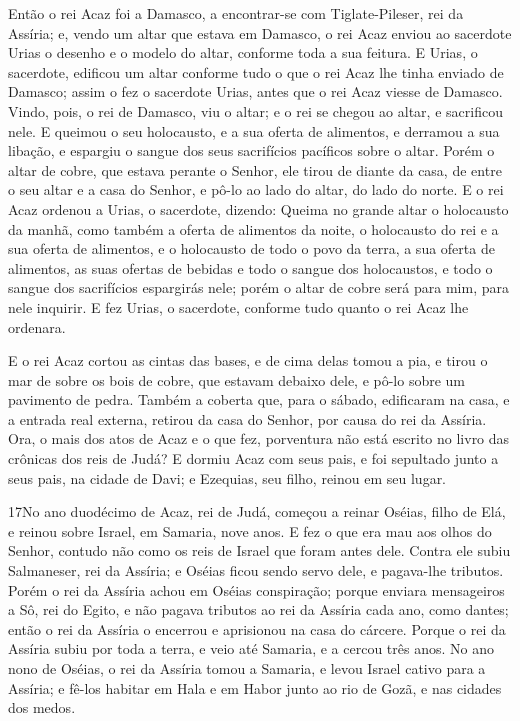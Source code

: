 Então o rei Acaz foi a Damasco, a encontrar-se com
Tiglate-Pileser, rei da Assíria; e, vendo um altar que estava em
Damasco, o rei Acaz enviou ao sacerdote Urias o desenho e o modelo
do altar, conforme toda a sua feitura. E Urias, o sacerdote,
edificou um altar conforme tudo o que o rei Acaz lhe tinha enviado
de Damasco; assim o fez o sacerdote Urias, antes que o rei Acaz
viesse de Damasco. Vindo, pois, o rei de Damasco, viu o
altar; e o rei se chegou ao altar, e sacrificou nele. E
queimou o seu holocausto, e a sua oferta de alimentos, e derramou a
sua libação, e espargiu o sangue dos seus sacrifícios pacíficos
sobre o altar. Porém o altar de cobre, que estava perante o
Senhor, ele tirou de diante da casa, de entre o seu altar e a casa
do Senhor, e pô-lo ao lado do altar, do lado do norte. E o
rei Acaz ordenou a Urias, o sacerdote, dizendo: Queima no grande
altar o holocausto da manhã, como também a oferta de alimentos da
noite, o holocausto do rei e a sua oferta de alimentos, e o
holocausto de todo o povo da terra, a sua oferta de alimentos, as
suas ofertas de bebidas e todo o sangue dos holocaustos, e todo o
sangue dos sacrifícios espargirás nele; porém o altar de cobre será
para mim, para nele inquirir. E fez Urias, o sacerdote,
conforme tudo quanto o rei Acaz lhe ordenara.

E o rei Acaz cortou as cintas das bases, e de cima delas tomou a
pia, e tirou o mar de sobre os bois de cobre, que estavam debaixo
dele, e pô-lo sobre um pavimento de pedra. Também a coberta
que, para o sábado, edificaram na casa, e a entrada real externa,
retirou da casa do Senhor, por causa do rei da Assíria. Ora,
o mais dos atos de Acaz e o que fez, porventura não está escrito no
livro das crônicas dos reis de Judá? E dormiu Acaz com seus
pais, e foi sepultado junto a seus pais, na cidade de Davi; e
Ezequias, seu filho, reinou em seu lugar.

\medskip

\lettrine{17} No ano duodécimo de Acaz, rei de Judá, começou a
reinar Oséias, filho de Elá, e reinou sobre Israel, em Samaria, nove
anos. E fez o que era mau aos olhos do Senhor, contudo não como
os reis de Israel que foram antes dele. Contra ele subiu
Salmaneser, rei da Assíria; e Oséias ficou sendo servo dele, e
pagava-lhe tributos. Porém o rei da Assíria achou em Oséias
conspiração; porque enviara mensageiros a Sô, rei do Egito, e não
pagava tributos ao rei da Assíria cada ano, como dantes; então o rei
da Assíria o encerrou e aprisionou na casa do cárcere. Porque o
rei da Assíria subiu por toda a terra, e veio até Samaria, e a
cercou três anos. No ano nono de Oséias, o rei da Assíria tomou
a Samaria, e levou Israel cativo para a Assíria; e fê-los habitar em
Hala e em Habor junto ao rio de Gozã, e nas cidades dos medos.

